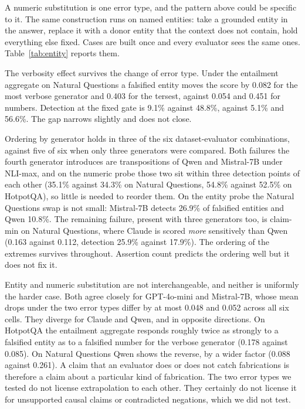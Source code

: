 \label{sec:entity}

A numeric substitution is one error type, and the pattern above could be specific to it. The same construction runs on named entities: take a grounded entity in the answer, replace it with a donor entity that the context does not contain, hold everything else fixed. Cases are built once and every evaluator sees the same ones. Table~\ref{tab:entity} reports them.

The verbosity effect survives the change of error type. Under the entailment aggregate on Natural Questions a falsified entity moves the score by 0.082 for the most verbose generator and 0.403 for the tersest, against 0.054 and 0.451 for numbers. Detection at the fixed gate is 9.1\% against 48.8\%, against 5.1\% and 56.6\%. The gap narrows slightly and does not close.

Ordering by generator holds in three of the six dataset-evaluator combinations, against five of six when only three generators were compared. Both failures the fourth generator introduces are transpositions of Qwen and Mistral-7B under NLI-max, and on the numeric probe those two sit within three detection points of each other (35.1\% against 34.3\% on Natural Questions, 54.8\% against 52.5\% on HotpotQA), so little is needed to reorder them. On the entity probe the Natural Questions swap is not small: Mistral-7B detects 26.9\% of falsified entities and Qwen 10.8\%. The remaining failure, present with three generators too, is claim-min on Natural Questions, where Claude is scored \emph{more} sensitively than Qwen (0.163 against 0.112, detection 25.9\% against 17.9\%). The ordering of the extremes survives throughout. Assertion count predicts the ordering well but it does not fix it.

Entity and numeric substitution are not interchangeable, and neither is uniformly the harder case. Both agree closely for GPT-4o-mini and Mistral-7B, whose mean drops under the two error types differ by at most 0.048 and 0.052 across all six cells. They diverge for Claude and Qwen, and in opposite directions. On HotpotQA the entailment aggregate responds roughly twice as strongly to a falsified entity as to a falsified number for the verbose generator (0.178 against 0.085). On Natural Questions Qwen shows the reverse, by a wider factor (0.088 against 0.261). A claim that an evaluator does or does not catch fabrications is therefore a claim about a particular kind of fabrication. The two error types we tested do not license extrapolation to each other. They certainly do not license it for unsupported causal claims or contradicted negations, which we did not test.

